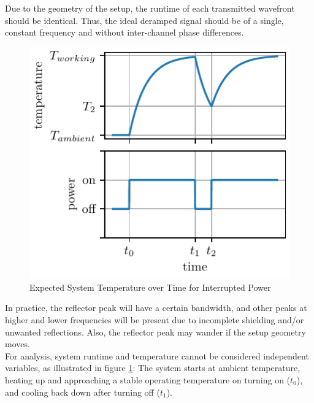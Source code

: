 Due to the geometry of the setup, the runtime of each transmitted wavefront should be identical.
Thus, the ideal deramped signal should be of a single, constant frequency and without inter-channel phase differences.
\begin{figure}
    \centering
    \includegraphics[height=0.25\textheight]{../figures/expected_temperature.pdf}
    \caption{Expected System Temperature over Time for Interrupted Power}
    \label{fig:exp_temp}
\end{figure}
In practice, the reflector peak will have a certain bandwidth,
and other peaks at higher and lower frequencies will be present due to incomplete shielding and/or unwanted reflections.
Also, the reflector peak may wander if the setup geometry moves. \\
For analysis, system runtime and temperature cannot be considered independent variables, as illustrated in figure \ref{fig:exp_temp}:
The system starts at ambient temperature, heating up and approaching a stable operating temperature on turning on ($t_0$), and cooling back down after turning off ($t_1$). \\
